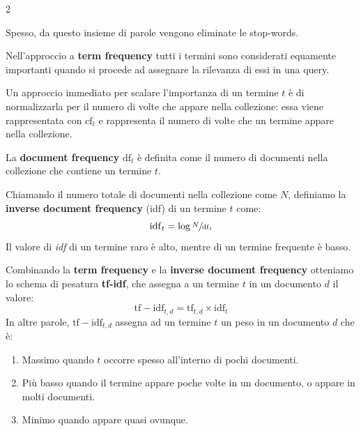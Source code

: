 \documentclass[\main/main.tex]{subfiles}
\begin{document}
\begin{multicols}{2}
\begin{definition}
    Spesso, da questo insieme di parole vengono eliminate le stop-words.
\end{definition}
\begin{observation}
    Nell'approccio a \textbf{term frequency} tutti i termini sono considerati equamente importanti quando si procede ad assegnare la rilevanza di essi in una query.
\end{observation}
\begin{definition}
    Un approccio immediato per scalare l'importanza di un termine \(t\) è di normalizzarla per il numero di volte che appare nella collezione: essa viene rappresentata con \(\text{cf}_t\) e rappresenta il numero di volte che un termine appare nella collezione.
\end{definition}
\begin{definition}
    La \textbf{document frequency} \(\text{df}_t\) è definita come il numero di documenti nella collezione che contiene un termine \(t\).
\end{definition}
\begin{definition}
    Chiamando il numero totale di documenti nella collezione come \(N\), definiamo la \textbf{inverse document frequency} (idf) di un termine \(t\) come:
    \[
        \mathrm{idf}_{t}=\log \sfrac{N}{\mathrm{df}_{t}}
    \]
    Il valore di \textit{idf} di un termine raro è alto, mentre di un termine frequente è basso.
\end{definition}
\begin{definition}[TF-IDF]
    Combinando la \textbf{term frequency} e la \textbf{inverse document frequency} otteniamo lo schema di pesatura \textbf{tf-idf}, che assegna a un termine \(t\) in un documento \(d\) il valore:
    \[
        \mathrm{tf}-\mathrm{idf}_{t, d}=\mathrm{tf}_{t, d} \times \mathrm{idf}_{t}
    \]
    In altre parole, \(\mathrm{tf}-\mathrm{idf}_{t, d}\) assegna ad un termine \(t\) un peso in un documento \(d\) che è:
    \begin{enumerate}
        \item Massimo quando \(t\) occorre spesso all'interno di pochi documenti.
        \item Più basso quando il termine appare poche volte in un documento, o appare in molti documenti.
        \item Minimo quando appare quasi ovunque.
    \end{enumerate}
\end{definition}

\end{multicols}
\end{document}
